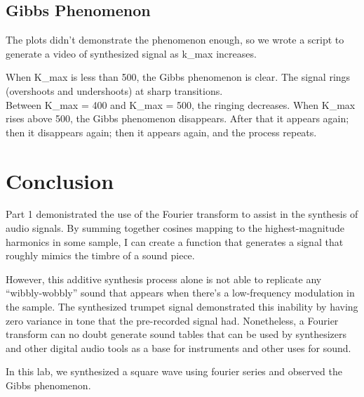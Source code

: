 \documentclass[11pt]{article}
\begin{document}


\subsection{Gibbs Phenomenon}

The plots didn't demonstrate the phenomenon enough,
so we wrote a script to generate a video of synthesized signal
as k\_{max} increases.



When K\_{max} is less than 500, the Gibbs phenomenon is clear.
The signal rings (overshoots and undershoots) at sharp transitions.\\

Between K\_{max} = 400 and K\_{max} = 500, the ringing decreases.
When K\_{max} rises above 500, the Gibbs phenomenon disappears.
After that it appears again; then it disappears again; 
then it appears again, and the process repeats.

\section{Conclusion}

Part 1 demonistrated the use of the Fourier transform to assist in the synthesis of audio signals.
By summing together cosines mapping to the highest-magnitude harmonics in some sample, I can create a function that generates a signal that roughly mimics the timbre of a sound piece.

However, this additive synthesis process alone is not able to replicate any ``wibbly-wobbly'' sound that appears when there's a low-frequency modulation in the sample.
The synthesized trumpet signal demonstrated this inability by having zero variance in tone that the pre-recorded signal had.
Nonetheless, a Fourier transform can no doubt generate sound tables that can be used by synthesizers and other digital audio tools as a base for instruments and other uses for sound.

In this lab, we synthesized a square wave using 
fourier series and observed the Gibbs phenomenon.
\end{document}
